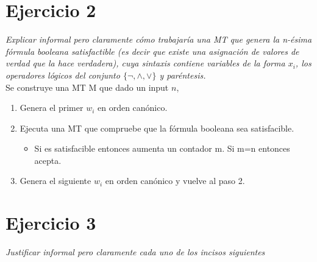\documentclass[lnbip]{svmultln}
\begin{document}
\section{Ejercicio 2}

\textit{Explicar informal pero claramente cómo trabajaría una MT que genera la n-ésima fórmula booleana satisfactible (es decir que existe una asignación de valores de verdad que la hace verdadera), cuya sintaxis contiene variables de la forma $x_i$, los operadores lógicos del conjunto $\{ \neg,\land ,\lor \}$ y paréntesis.} \\

Se construye una MT M que dado un input $n$,

\begin{enumerate}
    \item Genera el primer $w_i$ en orden canónico.
    \item Ejecuta una MT que compruebe que la fórmula booleana sea satisfacible.
    
    \begin{itemize}
        \item Si es satisfacible entonces aumenta un contador m. Si m=n entonces acepta.
    \end{itemize}
    
    \item Genera el siguiente $w_i$ en orden canónico y vuelve al paso 2.
\end{enumerate}

\section{Ejercicio 3}

\textit{Justificar informal pero claramente cada uno de los incisos siguientes} \\
\end{document}
